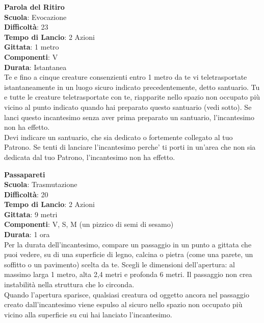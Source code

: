 \begin{multicols}{2}
\medskip\textbf{Parola del Ritiro}\\
\textbf{Scuola}: Evocazione\\
\textbf{Difficoltà}:  23\\
\textbf{Tempo di Lancio}: 2 Azioni\\
\textbf{Gittata}: 1 metro\\
\textbf{Componenti}: V\\
\textbf{Durata}: Istantanea\\
Te e fino a cinque creature consenzienti entro 1 metro da te vi teletrasportate istantaneamente in un luogo sicuro indicato precedentemente, detto santuario. Tu e tutte le creature teletrasportate con te, riapparite nello spazio non occupato più vicino al punto indicato quando hai preparato questo santuario (vedi sotto). Se lanci questo incantesimo senza aver prima preparato un santuario, l'incantesimo non ha effetto.\\
Devi indicare un santuario, che sia dedicato o fortemente collegato al tuo Patrono. Se tenti di lanciare l'incantesimo perche' ti porti in un'area che non sia dedicata dal tuo Patrono, l'incantesimo non ha effetto.

\medskip\textbf{Passapareti}\\
\textbf{Scuola}: Trasmutazione\\
\textbf{Difficoltà}:  20\\
\textbf{Tempo di Lancio}: 2 Azioni\\
\textbf{Gittata}: 9 metri\\
\textbf{Componenti}: V, S, M (un pizzico di semi di sesamo)\\
\textbf{Durata}: 1 ora\\
Per la durata dell'incantesimo, compare un passaggio in un punto a gittata che puoi vedere, su di una superficie di legno, calcina o pietra (come una parete, un soffitto o un pavimento) scelta da te. Scegli le dimensioni dell'apertura: al massimo larga 1 metro,  alta 2,4 metri e profonda 6 metri. Il passaggio non crea instabilità nella struttura che lo circonda.\\
Quando l’apertura sparisce, qualsiasi creatura od oggetto ancora nel passaggio creato dall'incantesimo viene espulso al sicuro nello spazio non occupato più vicino alla superficie su cui hai lanciato l'incantesimo.


\end{multicols}
